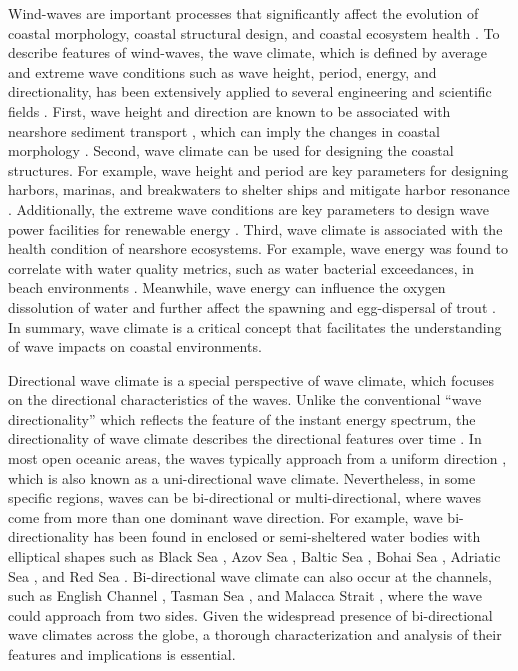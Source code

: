 Wind-waves are important processes that significantly affect the evolution of
coastal morphology, coastal structural design, and coastal ecosystem health
\citep{casas2024wind}. To describe features of wind-waves, the wave climate,
which is defined by average and extreme wave conditions such as wave height,
period, energy, and directionality, has been extensively applied to several
engineering and scientific fields
\citep{wiegel_oceanographical_1964,wiegel_oceanographical_2013}. First, wave
height and direction are known to be associated with nearshore sediment
transport \citep{pethick_introduction_1984,davila_promoting_2014}, which can
imply the changes in coastal morphology
\citep{lamoe_wave_1989,benumof_relationship_2000,brown_factors_2005}. Second,
wave climate can be used for designing the coastal structures. For example, wave
height and period are key parameters for designing harbors, marinas, and
breakwaters to shelter ships and mitigate harbor resonance
\citep{belvoir_problems_1981,usace_hydraulic_1984,rabinovich_seiches_2009}.
Additionally, the extreme wave conditions are key parameters to design wave
power facilities for renewable energy
\citep{guillou_wave_2020,neary_characterization_2020}. Third, wave climate is
associated with the health condition of nearshore ecosystems. For example, wave
energy was found to correlate with water quality metrics, such as water
bacterial exceedances, in beach environments \citep{feng_wave_2016}. Meanwhile,
wave energy can influence the oxygen dissolution of water and further affect the
spawning and egg-dispersal of trout
\citep{sly_interstitial_1988,fitzsimons_relationship_2014}. In summary, wave
climate is a critical concept that facilitates the understanding of wave impacts
on coastal environments.

Directional wave climate is a special perspective of wave climate, which focuses
on the directional characteristics of the waves. Unlike the conventional “wave
directionality” which reflects the feature of the instant energy spectrum, the
directionality of wave climate describes the directional features over time
\citep{wiggins_coastal_2019,wiggins_regionally-coherent_2019}. In most open
oceanic areas, the waves typically approach from a uniform direction
\citep{echevarria_seasonal_2019, echevarria_influence_2020}, which is also known
as a uni-directional wave climate. Nevertheless, in some specific regions, waves
can be bi-directional or multi-directional, where waves come from more than one
dominant wave direction. For example, wave bi-directionality has been found in
enclosed or semi-sheltered water bodies with elliptical shapes such as Black Sea
\citep{gippius_black_2020}, Azov Sea \citep{amarouche_wind-sea_2024}, Baltic Sea
\citep{mannikus_directional_2023}, Bohai Sea \citep{miao_study_2024}, Adriatic
Sea \citep{mannikus_directional_2023}, and Red Sea \citep{shamji_extreme_2020}.
Bi-directional wave climate can also occur at the channels, such as English
Channel \citep{wiggins_regionally-coherent_2019}, Tasman Sea
\citep{mortlock_directional_2015}, and Malacca Strait
\citep{aboobacker_wave_2017}, where the wave could approach from two sides.
Given the widespread presence of bi-directional wave climates across the globe,
a thorough characterization and analysis of their features and implications is
essential.

